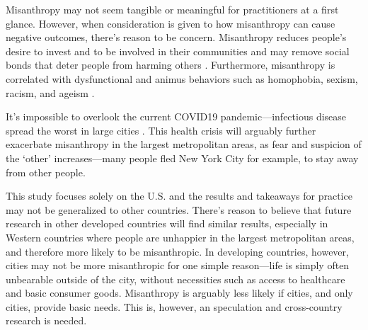 \documentclass[11pt, letterpaper]{article}
\begin{document}
\begin{spacing}{1.4}
Misanthropy may not seem tangible or meaningful for practitioners at a first glance. However, when consideration is given to how misanthropy can cause negative outcomes, there's reason to be concern. Misanthropy reduces people's desire to invest and to be involved in their communities and may remove social bonds that deter people from harming others
 \citep{weaver2006,hirschi1993,fafchamps2006,walters2013}. Furthermore, misanthropy is correlated with dysfunctional and animus behaviors such as
 homophobia, sexism, racism, and ageism \citep{cattacin2006}. 
 
It's impossible to overlook the current COVID19 pandemic---infectious disease
spread the worst in large cities \citep{bettencourt10}. This health crisis will arguably further exacerbate misanthropy in the largest metropolitan areas, as fear and suspicion of the `other' increases---many people fled New York City for example, to stay  away from other people. 



This study focuses solely on the U.S. and the results and takeaways for practice may
not be generalized to other countries. 
There's reason to believe that future research in other developed countries will find similar results, especially in Western countries where people are unhappier in the largest metropolitan areas, and therefore more likely to be misanthropic. %
In developing countries, however, cities may not be more misanthropic for one simple
reason---life is simply often unbearable outside of the city, without necessities such as access to healthcare and basic consumer goods. Misanthropy is arguably less likely if cities, and only cities, provide basic needs. This is, however, an speculation and cross-country research is needed.



\end{spacing}
\end{document}
